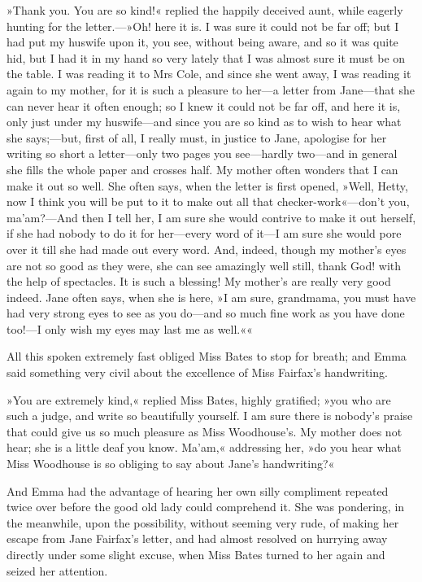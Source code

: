 »Thank you. You are so kind!« replied the happily deceived aunt, while eagerly hunting for the letter.—»Oh! here it is. I was sure it could not be far off; but I had put my huswife upon it, you see, without being aware, and so it was quite hid, but I had it in my hand so very lately that I was almost sure it must be on the table. I was reading it to Mrs Cole, and since she went away, I was reading it again to my mother, for it is such a pleasure to her—a letter from Jane—that she can never hear it often enough; so I knew it could not be far off, and here it is, only just under my huswife—and since you are so kind as to wish to hear what she says;—but, first of all, I really must, in justice to Jane, apologise for her writing so short a letter—only two pages you see—hardly two—and in general she fills the whole paper and crosses half. My mother often wonders that I can make it out so well. She often says, when the letter is first opened, »Well, Hetty, now I think you will be put to it to make out all that checker-work«—don't you, ma'am?—And then I tell her, I am sure she would contrive to make it out herself, if she had nobody to do it for her—every word of it—I am sure she would pore over it till she had made out every word. And, indeed, though my mother's eyes are not so good as they were, she can see amazingly well still, thank God! with the help of spectacles. It is such a blessing! My mother's are really very good indeed. Jane often says, when she is here, »I am sure, grandmama, you must have had very strong eyes to see as you do—and so much fine work as you have done too!—I only wish my eyes may last me as well.««

All this spoken extremely fast obliged Miss Bates to stop for breath; and Emma said something very civil about the excellence of Miss Fairfax's handwriting.

»You are extremely kind,« replied Miss Bates, highly gratified; »you who are such a judge, and write so beautifully yourself. I am sure there is nobody's praise that could give us so much pleasure as Miss Woodhouse's. My mother does not hear; she is a little deaf you know. Ma'am,« addressing her, »do you hear what Miss Woodhouse is so obliging to say about Jane's handwriting?«

And Emma had the advantage of hearing her own silly compliment repeated twice over before the good old lady could comprehend it. She was pondering, in the meanwhile, upon the possibility, without seeming very rude, of making her escape from Jane Fairfax's letter, and had almost resolved on hurrying away directly under some slight excuse, when Miss Bates turned to her again and seized her attention.

